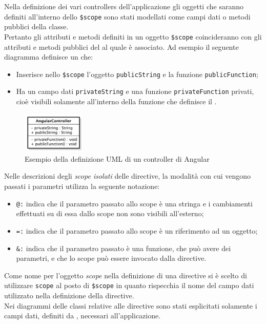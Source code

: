 Nella definizione dei vari controllers dell'applicazione gli oggetti che saranno definiti all'interno dello \texttt{\$scope} sono stati modellati come campi dati o metodi pubblici della classe. \\
Pertanto gli attributi e metodi definiti in un oggetto \texttt{\$scope} coincideranno con gli attributi e metodi pubblici del  al quale è associato.
Ad esempio il seguente diagramma  definisce un  che:
\begin{itemize}
\item Inserisce nello \texttt{\$scope} l'oggetto \texttt{publicString} e la funzione \texttt{publicFunction};
\item Ha un campo dati \texttt{privateString} e una funzione \texttt{privateFunction} privati, cioè visibili solamente all'interno della funzione che definisce il .
\end{itemize}
\begin{figure}[H]
\centering
\includegraphics[width=3cm]{../immagini/angularController.pdf}
\caption{Esempio della definizione UML di un controller di Angular}
\label{fig:contorllerAngular}
\end{figure}
\FloatBarrier
{}
Nelle descrizioni degli \textit{scope isolati} delle directive, la modalità con cui vengono passati i parametri utilizza la seguente notazione:
\begin{itemize}
\item \texttt{@:} indica che il parametro passato allo scope è una stringa e i cambiamenti effettuati su di essa dallo scope non sono visibili all'esterno;
\item \texttt{=:} indica che il parametro passato allo scope è un riferimento ad un oggetto;
\item \texttt{\&:} indica che il parametro passato è una funzione, che può avere dei parametri, e che lo scope può essere invocato dalla directive.
\end{itemize}
Come nome per l'oggetto \textit{scope} nella definizione di una directive si è scelto di utilizzare \texttt{scope} al posto di \texttt{\$scope} in quanto rispecchia il nome del campo dati utilizzato nella definizione della directive.\\
Nei diagrammi delle classi relative alle directive sono stati esplicitati solamente i campi dati, definiti da , necessari all'applicazione.
